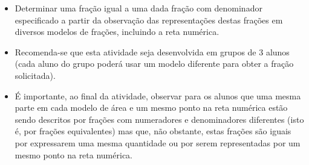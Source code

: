 \begin{multicols}{2}
\begin{solucao}{}{}
\begin{center}
\end{center}

\end{solucao}

\Bg
\Bg

\begin{objetivos}[label=chap4-ativ8]{}{}
\begin{itemize} %
    \item       Determinar uma fração igual a uma dada fração com denominador
especificado a partir da observação das representações destas frações em
diversos modelos de frações, incluindo a reta numérica.
\end{itemize} %

\end{objetivos}

\begin{orientacoes}

\begin{itemize} %
    \item       Recomenda-se que esta atividade seja desenvolvida em grupos de 3
alunos (cada aluno do grupo poderá usar um modelo diferente para obter a fração
solicitada).
    \item       É importante, ao final da atividade, observar para os alunos que
uma mesma parte em cada modelo de área e um mesmo ponto na reta numérica estão
sendo descritos por frações com numeradores e denominadores diferentes (isto é,
por frações equivalentes) mas que, não obstante, estas frações são iguais por
expressarem uma mesma quantidade ou por serem representadas por um mesmo ponto
na reta numérica.
\end{itemize} %





\end{orientacoes}
\end{multicols}
